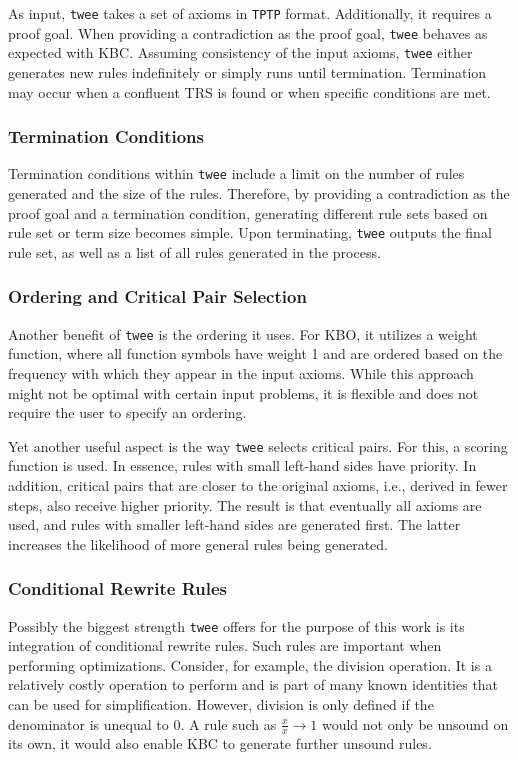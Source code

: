 As input, \texttt{twee} takes a set of axioms in \texttt{TPTP} format. Additionally, it requires a proof goal. When providing a contradiction as the proof goal, \texttt{twee} behaves as expected with KBC. Assuming consistency of the input axioms, \texttt{twee} either generates new rules indefinitely or simply runs until termination. Termination may occur when a confluent TRS is found or when specific conditions are met.

\subsubsection{Termination Conditions}
Termination conditions within \texttt{twee} include a limit on the number of rules generated and the size of the rules. Therefore, by providing a contradiction as the proof goal and a termination condition, generating different rule sets based on rule set or term size becomes simple. Upon terminating, \texttt{twee} outputs the final rule set, as well as a list of all rules generated in the process.

\subsubsection{Ordering and Critical Pair Selection}
Another benefit of \texttt{twee} is the ordering it uses. For KBO, it utilizes a weight function, where all function symbols have weight 1 and are ordered based on the frequency with which they appear in the input axioms. While this approach might not be optimal with certain input problems, it is flexible and does not require the user to specify an ordering.

Yet another useful aspect is the way \texttt{twee} selects critical pairs. For this, a scoring function is used. In essence, rules with small left-hand sides have priority. In addition, critical pairs that are closer to the original axioms, i.e., derived in fewer steps, also receive higher priority. The result is that eventually all axioms are used, and rules with smaller left-hand sides are generated first. The latter increases the likelihood of more general rules being generated.

\subsubsection{Conditional Rewrite Rules}
Possibly the biggest strength \texttt{twee} offers for the purpose of this work is its integration of conditional rewrite rules. Such rules are important when performing optimizations. Consider, for example, the division operation. It is a relatively costly operation to perform and is part of many known identities that can be used for simplification. However, division is only defined if the denominator is unequal to 0. A rule such as $\frac{x}{x} \to 1$ would not only be unsound on its own, it would also enable KBC to generate further unsound rules.

